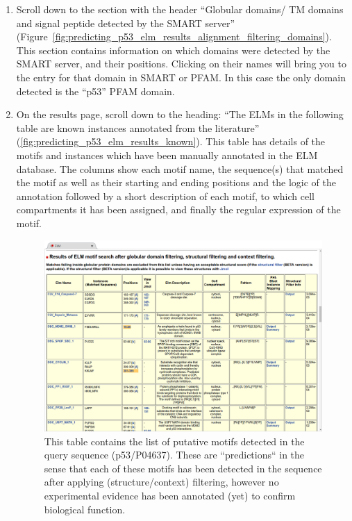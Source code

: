 \documentclass[12pt]{article}
\begin{document}
\begin{enumerate}
\item Scroll down to the section with the header ``Globular domains/ TM domains
	and signal peptide detected by the SMART server''
	(Figure~\ref{fig:predicting_p53_elm_results_alignment_filtering_domains}).
	This section contains information on which domains were detected by the
	SMART server, and their positions. Clicking on their names will bring
	you to the entry for that domain in SMART or PFAM.
	In this case the only domain detected is the ``p53'' PFAM domain.

\item On the results page, scroll down to the heading: ``The ELMs in the
	following table are known instances annotated from the literature''
	(\ref{fig:predicting_p53_elm_results_known}).
	This table has details of the motifs and instances which have been
	manually annotated in the ELM database. The columns show each motif
	name, the sequence(s) that matched the motif as well as their starting
	and ending positions and the logic of the annotation followed by a
	short description of each motif, to which cell compartments it has
	been assigned, and finally the regular expression of the motif.

\begin{figure}[h!]
	\centering
	\includegraphics[width=\textwidth]{Figures/predicting_p53/elm_results_motifs.png}
	\caption{
	This table contains the list of putative motifs detected in the query
	sequence (p53/P04637). These are ``predictions`` in the sense that each
	of these motifs has been detected in the sequence after applying
	(structure/context) filtering, however no experimental evidence has been
	annotated (yet) to confirm biological function.
	}
	\label{fig:predicting_p53_elm_results_motifs}
\end{figure}


\end{enumerate}
\end{document}
